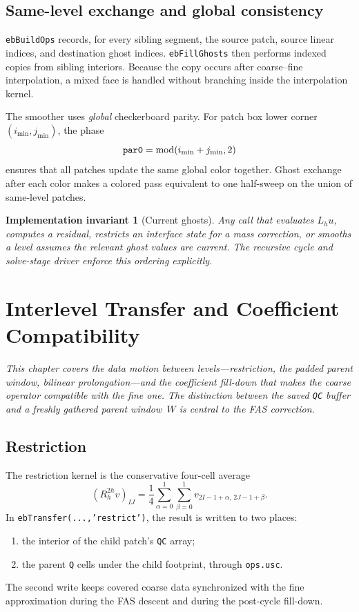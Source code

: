 \documentclass[11pt,oneside,openany]{book}
\newcommand{\code}[1]{\textnormal{\texttt{#1}}}
\newtheorem{invariant}{Implementation invariant}[chapter]
\begin{document}
\section{Same-level exchange and global consistency}
\code{ebBuildOps} records, for every sibling segment, the source patch, source linear indices, and destination ghost indices. \code{ebFillGhosts} then performs indexed copies from sibling interiors. Because the copy occurs after coarse--fine interpolation, a mixed face is handled without branching inside the interpolation kernel.

The smoother uses \emph{global} checkerboard parity. For patch box lower corner $(i_{\min},j_{\min})$, the phase
\[
  \code{par0}=\operatorname{mod}(i_{\min}+j_{\min},2)
\]
ensures that all patches update the same global color together. Ghost exchange after each color makes a colored pass equivalent to one half-sweep on the union of same-level patches.

\begin{invariant}[Current ghosts]
Any call that evaluates $L_hu$, computes a residual, restricts an interface state for a mass correction, or smooths a level assumes the relevant ghost values are current. The recursive cycle and solve-stage driver enforce this ordering explicitly.
\end{invariant}

\chapter{Interlevel Transfer and Coefficient Compatibility}
\label{chap:transfer}

\emph{This chapter covers the data motion between levels---restriction, the padded parent window, bilinear prolongation---and the coefficient fill-down that makes the coarse operator compatible with the fine one. The distinction between the saved \code{QC} buffer and a freshly gathered parent window~$W$ is central to the FAS correction.}

\section{Restriction}
The restriction kernel is the conservative four-cell average
\begin{equation}
  (R_h^{2h}v)_{IJ}
  =\frac14\sum_{\alpha=0}^{1}\sum_{\beta=0}^{1}
    v_{2I-1+\alpha,\,2J-1+\beta}.
  \label{eq:restriction}
\end{equation}
In \code{ebTransfer(...,'restrict')}, the result is written to two places:
\begin{enumerate}[label=(\alph*)]
\item the interior of the child patch's \code{QC} array;
\item the parent \code{Q} cells under the child footprint, through \code{ops.usc}.
\end{enumerate}
The second write keeps covered coarse data synchronized with the fine approximation during the FAS descent and during the post-cycle fill-down.
\end{document}
